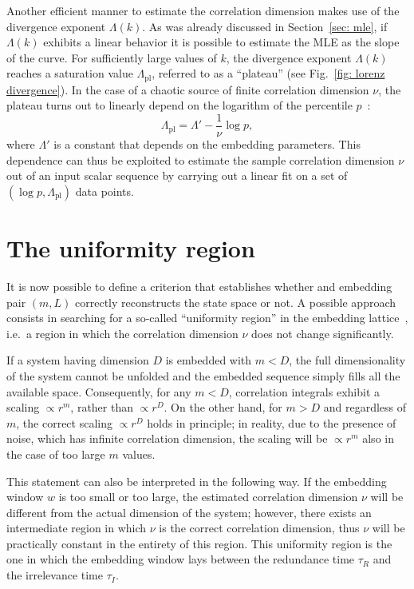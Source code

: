 Another efficient manner to estimate the correlation dimension makes use of the divergence exponent
$\Lambda(k)$. As was already discussed in Section~\ref{sec: mle}, if $\Lambda(k)$ exhibits a
linear behavior it is possible to estimate the MLE as the slope of the curve.
For sufficiently large values of $k$, the divergence exponent $\Lambda(k)$
reaches a saturation value $\Lambda_{\text{pl}}$, referred to as a ``plateau'' (see Fig.~\ref{fig: lorenz divergence}).
In the case of a chaotic source of finite correlation dimension $\nu$, the plateau
turns out to linearly depend on the logarithm of the percentile $p$~\cite{ref:perinelli2020chasing}:
\begin{equation}
    \label{eq: Lambda plateau}
    \Lambda_{\text{pl}}=\Lambda'-\frac{1}{\nu}\log p,
\end{equation}
where $\Lambda'$ is a constant that depends on the embedding parameters.
This dependence can thus be exploited to estimate the
sample correlation dimension $\nu$ out of an input scalar sequence by
carrying out a linear fit on a set of $(\log p, \Lambda_{\text{pl}})$ data points.


\section{The uniformity region}\label{sec: uniformity region}

It is now possible to define a criterion that establishes whether and embedding
pair $(m,L)$ correctly reconstructs the state space or not.
A possible approach consists in searching for a so-called ``uniformity region'' in the embedding
lattice~\cite{ref:perinelli2020chasing}, i.e.\ a region in which the correlation dimension $\nu$
does not change significantly.

If a system having dimension $D$ is embedded with $m < D$, the full dimensionality of the system cannot
be unfolded and the embedded sequence simply fills all the available space. Consequently, for any
$m < D$, correlation integrals exhibit a scaling $\propto r^m$, rather than $\propto r^D$.
On the other hand, for $m > D$ and regardless of $m$, the correct scaling $\propto r^D$ holds in principle;
in reality, due to the presence of noise, which has infinite correlation dimension, the scaling will
be $\propto r^m$ also in the case of too large $m$ values.

This statement can also be interpreted in the following way.
If the embedding window $w$ is too small or too large, the estimated correlation dimension $\nu$
will be different from the actual dimension of the system; however, there exists an intermediate region
in which $\nu$ is the correct correlation dimension, thus $\nu$ will be practically constant in
the entirety of this region. This uniformity region is the one in which the embedding window lays between
the redundance time $\tau_R$ and the irrelevance time $\tau_I$.


